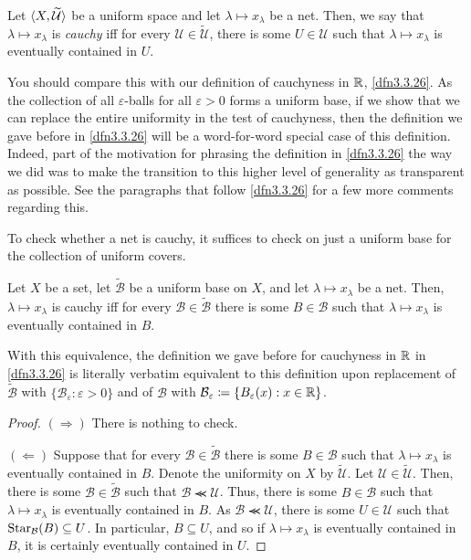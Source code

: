 \begin{dfn}[Cauchyness]\label{Cauchyness}
Let $\langle X,\widetilde{\mathcal{U}}\rangle$ be a uniform space and let $\lambda \mapsto x_\lambda$ be a net.  Then, we say that $\lambda \mapsto x_\lambda$ is \emph{cauchy} iff for every $\mathcal{U}\in \widetilde{\mathcal{U}}$, there is some $U\in \mathcal{U}$ such that $\lambda \mapsto x_\lambda$ is eventually contained in $U$.
\begin{rmk}
You should compare this with our definition of cauchyness in $\mathbb{R}$, \cref{dfn3.3.26}.  As the collection of all $\varepsilon$-balls for all $\varepsilon >0$ forms a uniform base, if we show that we can replace the entire uniformity in the test of cauchyness, then the definition we gave before in \cref{dfn3.3.26} will be a word-for-word special case of this definition.  Indeed, part of the motivation for phrasing the definition in \cref{dfn3.3.26} the way we did was to make the transition to this higher level of generality as transparent as possible.  See the paragraphs that follow \cref{dfn3.3.26} for a few more comments regarding this.
\end{rmk}
\end{dfn}
To check whether a net is cauchy, it suffices to check on just a uniform base for the collection of uniform covers.
\begin{prp}\label{prpB.16}
Let $X$ be a set, let $\widetilde{\mathcal{B}}$ be a uniform base on $X$, and let $\lambda \mapsto x_\lambda$ be a net.  Then, $\lambda \mapsto x_\lambda$ is cauchy iff for every $\mathcal{B}\in \widetilde{\mathcal{B}}$ there is some $B\in \mathcal{B}$ such that $\lambda \mapsto x_\lambda$ is eventually contained in $B$.
\begin{rmk}
With this equivalence, the definition we gave before for cauchyness in $\mathbb{R}$ in \cref{dfn3.3.26} is literally verbatim equivalent to this definition upon replacement of $\widetilde{\mathcal{B}}$ with $\{ \mathcal{B}_\varepsilon :\varepsilon >0\}$ and of $\mathcal{B}$ with $\mathcal{B}_\varepsilon \coloneqq \{ B_\varepsilon (x):x\in \mathbb{R} \}$.
\end{rmk}
\begin{proof}
$(\Rightarrow )$ There is nothing to check.

\blankline
\noindent
$(\Leftarrow )$ Suppose that for every $\mathcal{B}\in \widetilde{\mathcal{B}}$ there is some $B\in \mathcal{B}$ such that $\lambda \mapsto x_\lambda$ is eventually contained in $B$.  Denote the uniformity on $X$ by $\widetilde{\mathcal{U}}$.  Let $\mathcal{U}\in \widetilde{\mathcal{U}}$.  Then, there is some $\mathcal{B}\in \widetilde{\mathcal{B}}$ such that $\mathcal{B}\llcurly \mathcal{U}$.  Thus, there is some $B\in \mathcal{B}$ such that $\lambda \mapsto x_\lambda$ is eventually contained in $B$.  As $\mathcal{B}\llcurly \mathcal{U}$, there is some $U\in \mathcal{U}$ such that $\operatorname{Star} _{\mathcal{B}}(B)\subseteq U$.   In particular, $B\subseteq U$, and so if $\lambda \mapsto x_\lambda$ is eventually contained in $B$, it is certainly eventually contained in $U$.
\end{proof}
\end{prp}
